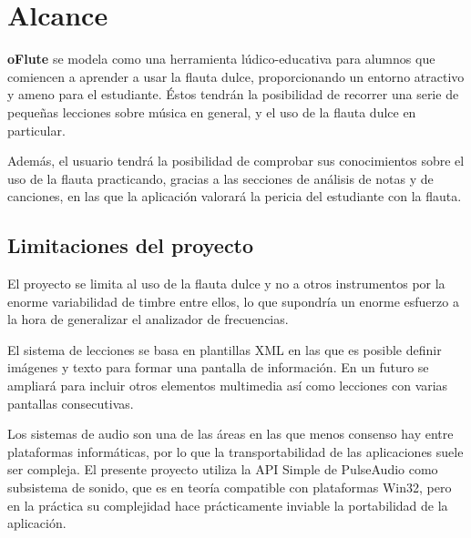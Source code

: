 \section{Alcance}
\textbf{oFlute} se modela como una herramienta lúdico-educativa para
alumnos que comiencen a aprender a usar la flauta dulce,
proporcionando un entorno atractivo y ameno para el estudiante. Éstos
tendrán la posibilidad de recorrer una serie de pequeñas lecciones
sobre música en general, y el uso de la flauta dulce en particular.

Además, el usuario tendrá la posibilidad de comprobar sus
conocimientos sobre el uso de la flauta practicando, gracias a las
secciones de análisis de notas y de canciones, en las que la
aplicación valorará la pericia del estudiante con la flauta.  

\subsection{Limitaciones del proyecto}
El proyecto se limita al uso de la flauta dulce y no a otros
instrumentos por la enorme variabilidad de timbre entre ellos, lo que
supondría un enorme esfuerzo a la hora de generalizar el analizador de
frecuencias.

El sistema de lecciones se basa en plantillas XML en las que es
posible definir imágenes y texto para formar una pantalla
de información. En un futuro se ampliará para incluir otros elementos
multimedia así como lecciones con varias pantallas consecutivas.

Los sistemas de audio son una de las áreas en las que menos consenso hay entre
plataformas informáticas, por lo que la transportabilidad de las aplicaciones
suele ser compleja. El presente proyecto utiliza la API Simple de PulseAudio
como subsistema de sonido, que es en teoría compatible con plataformas Win32,
pero en la práctica su complejidad hace prácticamente inviable la portabilidad
de la aplicación.

